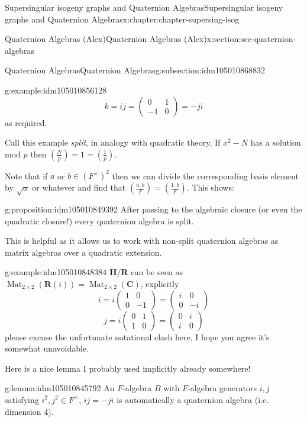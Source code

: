 \documentclass[oneside,10pt,]{book}
\numberwithin{equation}{section}
\newcommand{\legendre}[2]{\left(\frac{#1}{#2}\right)}
\newcommand{\RR}{\mathbf{R}}
\newcommand{\CC}{\mathbf{C}}
\newcommand{\HH}{\mathbf{H}}
\DeclareMathOperator{\Mat}{Mat}
\newcommand{\amp}{&}
\begin{document}
\begin{chapterptx}{Supersingular isogeny graphs and Quaternion Algebras}{}{Supersingular isogeny graphs and Quaternion Algebras}{}{}{x:chapter:chapter-supersing-isog}
\begin{sectionptx}{Quaternion Algebras (Alex)}{}{Quaternion Algebras (Alex)}{}{}{x:section:sec-quaternion-algebras}
\begin{subsectionptx}{Quaternion Algebras}{}{Quaternion Algebras}{}{}{g:subsection:idm105010868832}
\begin{introduction}{}
\begin{example}{}{g:example:idm105010856128}
\begin{equation*}
k = ij = \begin{pmatrix} 0\amp1\\-1\amp 0\end{pmatrix} = -ji
\end{equation*}
as required.%
\end{example}
Call this example \emph{split}, in analogy with quadratic theory,  If \(x^2 - N\) has a solution mod \(p\) then \(\legendre{N}{p} = 1 = \legendre{1}{p}\).%
\par
Note that if \(a\) or \(b \in (F^\times)^2\) then we can divide the corresponding basis element by \(\sqrt{a}\) or whatever and find that \(\legendre{a,b}{F} = \legendre{1,b}{F}\). This shows:%
\begin{proposition}{}{}{g:proposition:idm105010849392}%
After passing to the algebraic closure (or even the quadratic closure!) every quaternion algebra is split.%
\end{proposition}
This is helpful as it allows us to work with non-split quaternion algebras as matrix algebras over a quadratic extension.%
\begin{example}{}{g:example:idm105010848384}%
\(\HH/\RR\) can be seen as \(\Mat_{2\times 2}(\RR(i)) = \Mat_{2\times 2}(\CC)\), explicitly%
\begin{equation*}
i=  i\begin{pmatrix} 1\amp0\\0\amp -1\end{pmatrix} = \begin{pmatrix} i\amp0\\0\amp -i\end{pmatrix}
\end{equation*}
%
\begin{equation*}
j = i\begin{pmatrix} 0\amp1\\1\amp 0\end{pmatrix} = \begin{pmatrix} 0\amp i\\i\amp 0\end{pmatrix}
\end{equation*}
please excuse the unfortunate notational clash here, I hope you agree it's somewhat unavoidable.%
\end{example}
Here is a nice lemma I probably used implicitly already somewhere!%
\begin{lemma}{}{}{g:lemma:idm105010845792}%
An \(F\)-algebra \(B\) with \(F\)-algebra generators \(i,j\) satisfying \(i^2,j^2\in F^\times\), \(ij = -ji\) is automatically a quaternion algebra (i.e. dimension 4).%

\end{lemma}
\end{introduction}
\end{subsectionptx}
\end{sectionptx}
\end{chapterptx}
\end{document}
